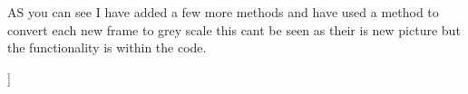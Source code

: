 AS you can see I have added a few more methods and have used a method to convert each new frame to grey scale this cant be seen as their is new picture but the functionality is within the code.

]
















